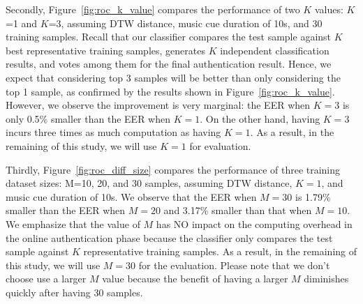 Secondly, Figure~\ref{fig:roc_k_value} compares the performance of two $K$ values: $K$=1 and $K$=3, assuming DTW distance, music cue duration of 10s, and 30 training samples. Recall that
our classifier compares the test sample against $K$ best representative training samples, generates $K$ independent classification results, and votes among them for the final authentication result. Hence, we expect that considering top 3 samples will be better than only considering the top 1 sample, as confirmed by the results shown in Figure~\ref{fig:roc_k_value}. However, we observe the improvement is very marginal: the EER when $K=3$ is only 0.5\% smaller than the EER when $K=1$. On the other hand, having $K=3$ incurs three times as much computation as having $K=1$. As a result, in the remaining of this study, we will use $K=1$ for evaluation.

Thirdly, Figure~\ref{fig:roc_diff_size} compares the performance of three training dataset sizes: M=10, 20, and 30 samples, assuming DTW distance, $K=1$, and music cue duration of 10s. We observe that the EER when $M=30$ is 1.79\% smaller than the EER when $M=20$ and 3.17\% smaller than that when $M=10$.  We emphasize that the value of $M$ has NO impact on the computing overhead in the online authentication phase because the classifier only compares the test sample against $K$ representative training samples. As a result, in the remaining of this study, we will use $M=30$ for the evaluation. Please note that we don't choose use a larger $M$ value because the benefit of having a larger $M$ diminishes quickly after having 30 samples.



